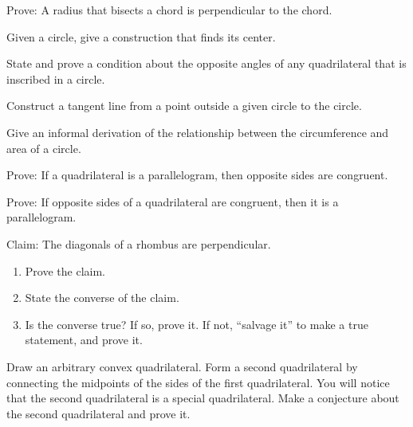 \begin{prob}
Prove:  A radius that bisects a chord is perpendicular to the chord. 
\end{prob}

\begin{prob}
Given a circle, give a construction that finds its center.
\end{prob}

\begin{prob}
State and prove a condition about the opposite angles of any quadrilateral that is inscribed in a circle.  
\end{prob}

\begin{prob}
Construct a tangent line from a point outside a given circle to the circle.
\end{prob}

\begin{prob}
Give an informal derivation of the relationship between the circumference and area of a circle. 
\end{prob}

\begin{prob}
Prove:  If a quadrilateral is a parallelogram, then opposite sides are congruent.
\end{prob}

\begin{prob}
Prove:  If opposite sides of a quadrilateral are congruent, then it is a parallelogram.
\end{prob}

\begin{prob}
Claim:  The diagonals of a rhombus are perpendicular. 
\begin{enumerate}
\item Prove the claim. 
\item State the converse of the claim. 
\item Is the converse true?  If so, prove it.  If not, ``salvage it'' to make a true statement, and prove it.  
\end{enumerate}
\end{prob}


\begin{prob}
Draw an arbitrary convex quadrilateral.  Form a second quadrilateral by connecting the midpoints of the sides 
of the first quadrilateral.  You will notice that the second quadrilateral is a special quadrilateral. Make a conjecture about the second quadrilateral and prove it.  
\end{prob}

